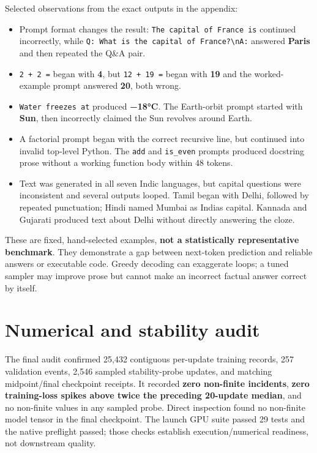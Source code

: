 \documentclass[10pt,a4paper]{article}
\newcommand{\tightlist}{\setlength{\itemsep}{0pt}\setlength{\parskip}{0pt}}
\begin{document}
Selected observations from the exact outputs in the appendix:

\begin{itemize}
\tightlist
\item
  Prompt format changes the result:
  \texttt{The\ capital\ of\ France\ is} continued incorrectly, while
  \texttt{Q:\ What\ is\ the\ capital\ of\ France?\textbackslash{}nA:}
  answered \textbf{Paris} and then repeated the Q\&A pair.
\item
  \texttt{2\ +\ 2\ =} began with \textbf{4}, but \texttt{12\ +\ 19\ =}
  began with \textbf{19} and the worked-example prompt answered
  \textbf{20}, both wrong.
\item
  \texttt{Water\ freezes\ at} produced \textbf{−18°C}. The Earth-orbit
  prompt started with \textbf{Sun}, then incorrectly claimed the Sun
  revolves around Earth.
\item
  A factorial prompt began with the correct recursive line, but
  continued into invalid top-level Python. The \texttt{add} and
  \texttt{is\_even} prompts produced docstring prose without a working
  function body within 48 tokens.
\item
  Text was generated in all seven Indic languages, but capital questions
  were inconsistent and several outputs looped. Tamil began with Delhi,
  followed by repeated punctuation; Hindi named Mumbai as
  India\textquotesingle s capital. Kannada and Gujarati produced text
  about Delhi without directly answering the cloze.
\end{itemize}

These are fixed, hand-selected examples, \textbf{not a statistically
representative benchmark}. They demonstrate a gap between next-token
prediction and reliable answers or executable code. Greedy decoding can
exaggerate loops; a tuned sampler may improve prose but cannot make an
incorrect factual answer correct by itself.

\section{Numerical and stability
audit}\label{numerical-and-stability-audit}

The final audit confirmed 25,432 contiguous per-update training records,
257 validation events, 2,546 sampled stability-probe updates, and
matching midpoint/final checkpoint receipts. It recorded \textbf{zero
non-finite incidents}, \textbf{zero training-loss spikes above twice the
preceding 20-update median}, and no non-finite values in any sampled
probe. Direct inspection found no non-finite model tensor in the final
checkpoint. The launch GPU suite passed 29 tests and the native
preflight passed; those checks establish execution/numerical readiness,
not downstream quality.
\end{document}
